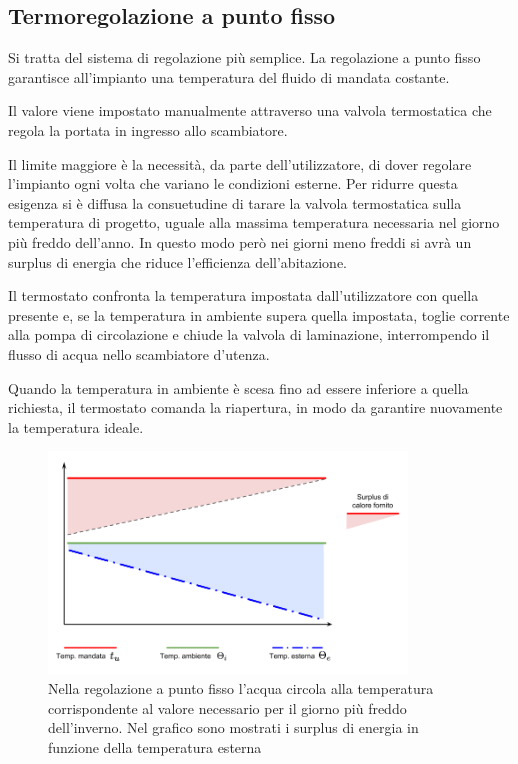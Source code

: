\documentclass[laurea,oneside,11pt]{USiena_tesiLM}
\begin{document}
\subsection{Termoregolazione a punto fisso}
Si tratta del sistema di regolazione più semplice. La regolazione a punto fisso garantisce all'impianto una temperatura del fluido di mandata costante. 

Il valore viene impostato manualmente attraverso una valvola termostatica che regola la portata in ingresso allo scambiatore.  

Il limite maggiore è la necessità, da parte dell'utilizzatore, di dover regolare l'impianto ogni volta che variano le condizioni esterne. Per ridurre questa esigenza si è diffusa la consuetudine di tarare la valvola termostatica sulla temperatura di progetto, uguale alla massima temperatura necessaria nel giorno più freddo dell'anno. In questo modo però nei giorni meno freddi si avrà un surplus di energia che riduce l'efficienza dell'abitazione.

Il termostato confronta la temperatura impostata dall'utilizzatore con quella presente e, se la temperatura in ambiente supera quella impostata, toglie corrente alla pompa di circolazione e chiude la valvola di laminazione, interrompendo il flusso di acqua nello scambiatore d'utenza. 

Quando la temperatura in ambiente è scesa fino ad essere inferiore a quella richiesta, il termostato comanda la riapertura, in modo da garantire nuovamente la temperatura ideale.

\begin{figure}[!ht]
\centering
\includegraphics[width=0.85\textwidth]{figure/surplus} 
\caption{Nella regolazione a punto fisso l'acqua circola alla temperatura corrispondente al valore necessario per il giorno più freddo dell'inverno. Nel grafico sono mostrati i surplus di energia in funzione della temperatura esterna}
\label{fig:surplus}
\end{figure}
\end{document}
